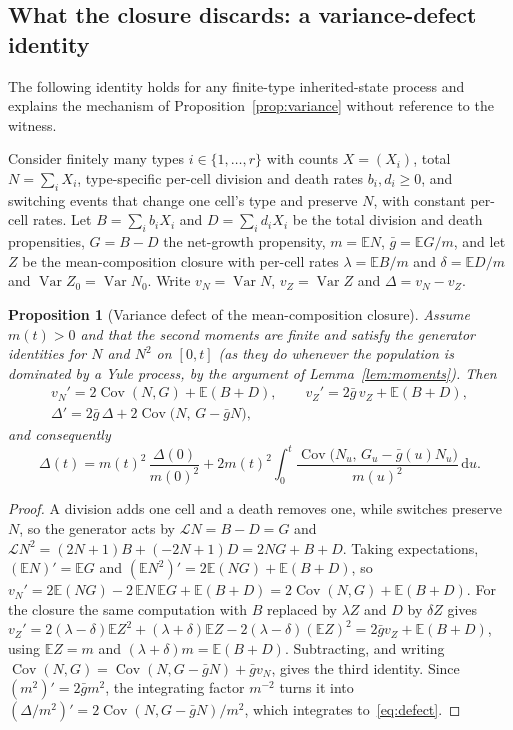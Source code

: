 \documentclass[11pt,a4paper]{article}
\theoremstyle{plain}
\newtheorem{proposition}[theorem]{Proposition}
\theoremstyle{definition}
\theoremstyle{remark}
\newcommand{\EE}{\mathbb E}
\newcommand{\Var}{\operatorname{Var}}
\newcommand{\Cov}{\operatorname{Cov}}
\newcommand{\cL}{\mathcal L}
\newcommand{\dd}{\mathrm d}
\begin{document}
\subsection{What the closure discards: a variance-defect identity}\label{sec:defect}
The following identity holds for any finite-type inherited-state process and explains the mechanism of Proposition~\ref{prop:variance} without reference to the witness.

Consider finitely many types $i\in\{1,\dots,r\}$ with counts $X=(X_i)$, total $N=\sum_iX_i$, type-specific per-cell division and death rates $b_i,d_i\ge0$, and switching events that change one cell's type and preserve $N$, with constant per-cell rates. Let $B=\sum_ib_iX_i$ and $D=\sum_id_iX_i$ be the total division and death propensities, $G=B-D$ the net-growth propensity, $m=\EE N$, $\bar g=\EE G/m$, and let $Z$ be the mean-composition closure with per-cell rates $\lambda=\EE B/m$ and $\delta=\EE D/m$ and $\Var Z_0=\Var N_0$. Write $v_N=\Var N$, $v_Z=\Var Z$ and $\Delta=v_N-v_Z$.

\begin{proposition}[Variance defect of the mean-composition closure]\label{prop:defect}
Assume $m(t)>0$ and that the second moments are finite and satisfy the generator identities for $N$ and $N^2$ on $[0,t]$ (as they do whenever the population is dominated by a Yule process, by the argument of Lemma~\ref{lem:moments}). Then
\begin{gather}
v_N'=2\Cov(N,G)+\EE(B+D),\qquad v_Z'=2\bar g\,v_Z+\EE(B+D),\label{eq:defectode}\\
\Delta'=2\bar g\,\Delta+2\Cov\bigl(N,\,G-\bar gN\bigr),\label{eq:defectode2}
\end{gather}
and consequently
\begin{equation}\label{eq:defect}
\Delta(t)=m(t)^2\,\frac{\Delta(0)}{m(0)^2}+2m(t)^2\int_0^t\frac{\Cov\bigl(N_u,\,G_u-\bar g(u)N_u\bigr)}{m(u)^2}\,\dd u .
\end{equation}
\end{proposition}
\begin{proof}
A division adds one cell and a death removes one, while switches preserve $N$, so the generator acts by $\cL N=B-D=G$ and $\cL N^2=(2N+1)B+(-2N+1)D=2NG+B+D$. Taking expectations, $(\EE N)'=\EE G$ and $(\EE N^2)'=2\EE(NG)+\EE(B+D)$, so $v_N'=2\EE(NG)-2\,\EE N\,\EE G+\EE(B+D)=2\Cov(N,G)+\EE(B+D)$. For the closure the same computation with $B$ replaced by $\lambda Z$ and $D$ by $\delta Z$ gives $v_Z'=2(\lambda-\delta)\EE Z^2+(\lambda+\delta)\EE Z-2(\lambda-\delta)(\EE Z)^2=2\bar gv_Z+\EE(B+D)$, using $\EE Z=m$ and $(\lambda+\delta)m=\EE(B+D)$. Subtracting, and writing $\Cov(N,G)=\Cov(N,G-\bar gN)+\bar gv_N$, gives the third identity. Since $(m^2)'=2\bar gm^2$, the integrating factor $m^{-2}$ turns it into $(\Delta/m^2)'=2\Cov(N,G-\bar gN)/m^2$, which integrates to~\eqref{eq:defect}.
\end{proof}
\end{document}

